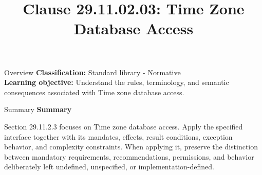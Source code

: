 \documentclass[10pt,letterpaper]{article}
\title{Clause 29.11.02.03: Time Zone Database Access}
\author{}
\date{}
\begin{document}
\maketitle
\begin{CornellOverviewBox}{Overview}
\textbf{Classification:} Standard library - Normative\\[2pt]
\textbf{Learning objective:} Understand the rules, terminology, and semantic consequences associated with Time zone database access.
\end{CornellOverviewBox}\begin{CornellSummaryBox}{Summary}
{\sffamily\bfseries\color{Accent} Summary}\par\vspace{3pt}Section 29.11.2.3 focuses on Time zone database access. Apply the specified interface together with its mandates, effects, result conditions, exception behavior, and complexity constraints. When applying it, preserve the distinction between mandatory requirements, recommendations, permissions, and behavior deliberately left undefined, unspecified, or implementation-defined.
\end{CornellSummaryBox}
\end{document}
